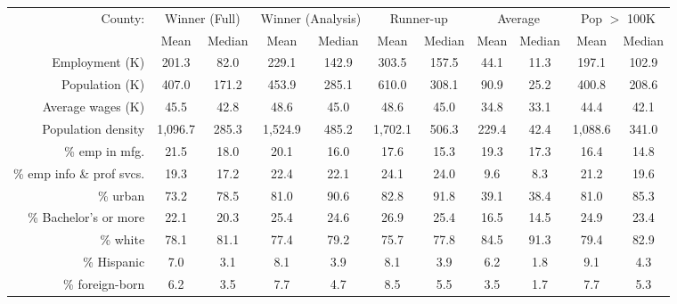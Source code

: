 \begin{tabular}{r*{5}{c}*{5}{c}} \toprule 
County:             &\multicolumn{2}{c}{Winner (Full)}&\multicolumn{2}{c}{Winner (Analysis)}&\multicolumn{2}{c}{Runner-up}&\multicolumn{2}{c}{Average}&\multicolumn{2}{c}{Pop $ >$ 100K }\\\cline{2-11}
                    &        Mean&      Median&        Mean&      Median&        Mean&      Median&        Mean&      Median&        Mean&      Median\\
\midrule
Employment (K)      &       201.3&        82.0&       229.1&       142.9&       303.5&       157.5&        44.1&        11.3&       197.1&       102.9\\
Population (K)      &       407.0&       171.2&       453.9&       285.1&       610.0&       308.1&        90.9&        25.2&       400.8&       208.6\\
Average wages (K)   &        45.5&        42.8&        48.6&        45.0&        48.6&        45.0&        34.8&        33.1&        44.4&        42.1\\
Population density  &     1,096.7&       285.3&     1,524.9&       485.2&     1,702.1&       506.3&       229.4&        42.4&     1,088.6&       341.0\\
\% emp in mfg.      &        21.5&        18.0&        20.1&        16.0&        17.6&        15.3&        19.3&        17.3&        16.4&        14.8\\
\% emp info \& prof svcs.&        19.3&        17.2&        22.4&        22.1&        24.1&        24.0&         9.6&         8.3&        21.2&        19.6\\
\% urban            &        73.2&        78.5&        81.0&        90.6&        82.8&        91.8&        39.1&        38.4&        81.0&        85.3\\
\% Bachelor's or more&        22.1&        20.3&        25.4&        24.6&        26.9&        25.4&        16.5&        14.5&        24.9&        23.4\\
\% white            &        78.1&        81.1&        77.4&        79.2&        75.7&        77.8&        84.5&        91.3&        79.4&        82.9\\
\% Hispanic         &         7.0&         3.1&         8.1&         3.9&         8.1&         3.9&         6.2&         1.8&         9.1&         4.3\\
\% foreign-born     &         6.2&         3.5&         7.7&         4.7&         8.5&         5.5&         3.5&         1.7&         7.7&         5.3\\

\end{tabular}
